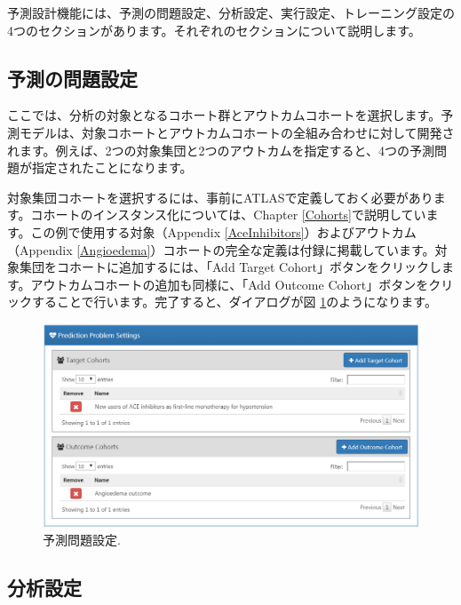 \documentclass[
  11pt]{book}
\theoremstyle{definition}
\theoremstyle{definition}
\theoremstyle{definition}
\theoremstyle{definition}
\theoremstyle{remark}
\begin{document}
予測設計機能には、予測の問題設定、分析設定、実行設定、トレーニング設定の4つのセクションがあります。それぞれのセクションについて説明します。

\subsection{予測の問題設定}\label{ux4e88ux6e2cux306eux554fux984cux8a2dux5b9a}

ここでは、分析の対象となるコホート群とアウトカムコホートを選択します。予測モデルは、対象コホートとアウトカムコホートの全組み合わせに対して開発されます。例えば、2つの対象集団と2つのアウトカムを指定すると、4つの予測問題が指定されたことになります。

対象集団コホートを選択するには、事前にATLASで定義しておく必要があります。コホートのインスタンス化については、Chapter \ref{Cohorts}で説明しています。この例で使用する対象（Appendix \ref{AceInhibitors}）およびアウトカム（Appendix \ref{Angioedema}）コホートの完全な定義は付録に掲載しています。対象集団をコホートに追加するには、「Add Target Cohort」ボタンをクリックします。アウトカムコホートの追加も同様に、「Add Outcome Cohort」ボタンをクリックすることで行います。完了すると、ダイアログが図 \ref{fig:problemSettings}のようになります。

\begin{figure}

{\centering \includegraphics[width=1\linewidth]{images/PatientLevelPrediction/problemSettings} 

}

\caption{予測問題設定.}\label{fig:problemSettings}
\end{figure}

\subsection{分析設定}\label{ux5206ux6790ux8a2dux5b9a}
\end{document}

